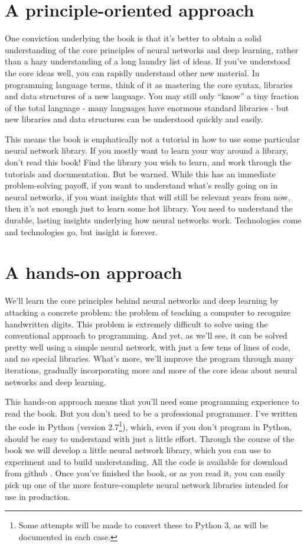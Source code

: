 \section*{A principle-oriented approach}

One conviction underlying the book is that it's better to obtain a solid understanding of the core principles of neural networks and deep learning, rather than a hazy understanding of a long laundry list of ideas. If you've understood the core ideas well, you can rapidly understand other new material. In programming language terms, think of it as mastering the core syntax, libraries and data structures of a new language. You may still only ``know'' a tiny fraction of the total language - many languages have enormous standard libraries - but new libraries and data structures can be understood quickly and easily.

This means the book is emphatically not a tutorial in how to use some particular neural network library. If you mostly want to learn your way around a library, don't read this book! Find the library you wish to learn, and work through the tutorials and documentation. But be warned. While this has an immediate problem-solving payoff, if you want to understand what's really going on in neural networks, if you want insights that will still be relevant years from now, then it's not enough just to learn some hot library. You need to understand the durable, lasting insights underlying how neural networks work. Technologies come and technologies go, but insight is forever.

\section*{A hands-on approach}

We'll learn the core principles behind neural networks and deep learning by attacking a concrete problem: the problem of teaching a computer to recognize handwritten digits. This problem is extremely difficult to solve using the conventional approach to programming. And yet, as we'll see, it can be solved pretty well using a simple neural network, with just a few tens of lines of code, and no special libraries. What's more, we'll improve the program through many iterations, gradually incorporating more and more of the core ideas about neural networks and deep learning.

This hands-on approach means that you'll need some programming experience to read the book. But you don't need to be a professional programmer. I've written the code in Python (version 2.7\footnote{Some attempts will be made to convert these to Python 3, as will be documented in each case.}), which, even if you don't program in Python, should be easy to understand with just a little effort. Through the course of the book we will develop a little neural network library, which you can use to experiment and to build understanding. All the code is available for download from github \cite{Nielsengithub2019}. Once you've finished the book, or as you read it, you can easily pick up one of the more feature-complete neural network libraries intended for use in production.

